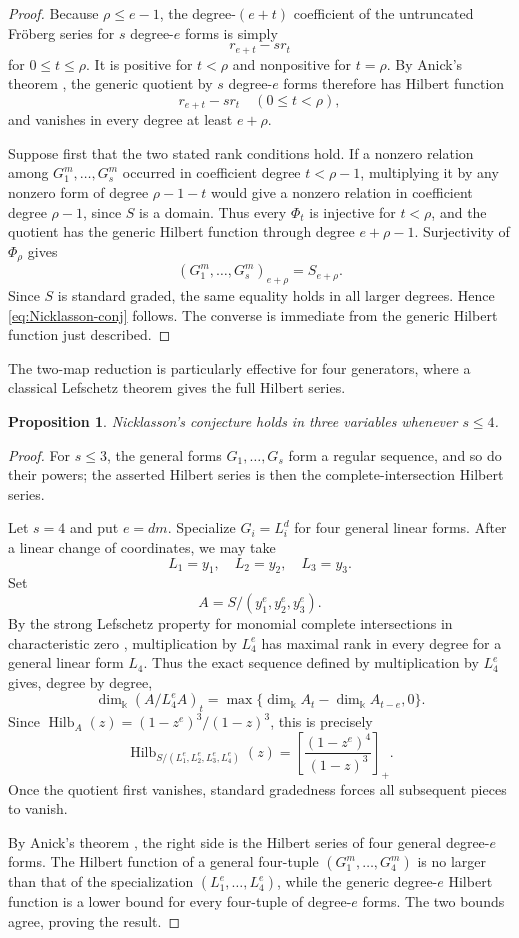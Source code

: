 \documentclass[11pt]{amsart}
\newtheorem{proposition}[theorem]{Proposition}
\theoremstyle{remark}
\newcommand{\kk}{\Bbbk}
\newcommand{\Hilb}{\operatorname{Hilb}}
\begin{document}
\begin{proof}
Because $\rho\le e-1$, the degree-$(e+t)$ coefficient of the untruncated Fr\"oberg series for $s$ degree-$e$ forms is simply
$$
r_{e+t}-sr_t
$$
for $0\le t\le\rho$. It is positive for $t<\rho$ and nonpositive for $t=\rho$. By Anick's theorem \cite{Anick}, the generic quotient by $s$ degree-$e$ forms therefore has Hilbert function
$$
r_{e+t}-sr_t\quad(0\le t<\rho),
$$
and vanishes in every degree at least $e+\rho$.

Suppose first that the two stated rank conditions hold. If a nonzero relation among $G_1^m,\ldots,G_s^m$ occurred in coefficient degree $t<\rho-1$, multiplying it by any nonzero form of degree $\rho-1-t$ would give a nonzero relation in coefficient degree $\rho-1$, since $S$ is a domain. Thus every $\Phi_t$ is injective for $t<\rho$, and the quotient has the generic Hilbert function through degree $e+\rho-1$. Surjectivity of $\Phi_\rho$ gives
$$
(G_1^m,\ldots,G_s^m)_{e+\rho}=S_{e+\rho}.
$$
Since $S$ is standard graded, the same equality holds in all larger degrees. Hence \eqref{eq:Nicklasson-conj} follows. The converse is immediate from the generic Hilbert function just described.
\end{proof}

The two-map reduction is particularly effective for four generators, where a classical Lefschetz theorem gives the full Hilbert series.

\begin{proposition}\label{prop:Nicklasson-four}
Nicklasson's conjecture holds in three variables whenever $s\le4$.
\end{proposition}

\begin{proof}
For $s\le3$, the general forms $G_1,\ldots,G_s$ form a regular sequence, and so do their powers; the asserted Hilbert series is then the complete-intersection Hilbert series.

Let $s=4$ and put $e=dm$. Specialize $G_i=L_i^d$ for four general linear forms. After a linear change of coordinates, we may take
$$
L_1=y_1,
\quad L_2=y_2,
\quad L_3=y_3.
$$
Set
$$
A=S/(y_1^e,y_2^e,y_3^e).
$$
By the strong Lefschetz property for monomial complete intersections in characteristic zero \cite{Stanley}, multiplication by $L_4^e$ has maximal rank in every degree for a general linear form $L_4$. Thus the exact sequence defined by multiplication by $L_4^e$ gives, degree by degree,
$$
\dim_\kk(A/L_4^eA)_t
=
\max\{\dim_\kk A_t-\dim_\kk A_{t-e},0\}.
$$
Since $\Hilb_A(z)=(1-z^e)^3/(1-z)^3$, this is precisely
$$
\Hilb_{S/(L_1^e,L_2^e,L_3^e,L_4^e)}(z)
=
\left[\frac{(1-z^e)^4}{(1-z)^3}\right]_+.
$$
Once the quotient first vanishes, standard gradedness forces all subsequent pieces to vanish.

By Anick's theorem \cite{Anick}, the right side is the Hilbert series of four general degree-$e$ forms. The Hilbert function of a general four-tuple $(G_1^m,\ldots,G_4^m)$ is no larger than that of the specialization $(L_1^e,\ldots,L_4^e)$, while the generic degree-$e$ Hilbert function is a lower bound for every four-tuple of degree-$e$ forms. The two bounds agree, proving the result.
\end{proof}
\end{document}
